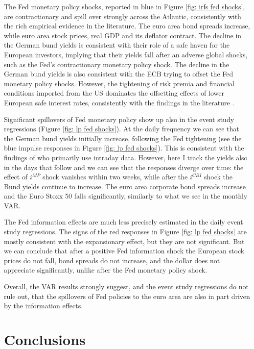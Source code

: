 \documentclass[a4paper,12pt]{article}
\begin{document}
The Fed monetary policy shocks, reported in blue in Figure \ref{fig: irfs fed shocks}, are contractionary and spill over strongly across the Atlantic, consistently with the rich empirical evidence in the literature.
The euro area bond spreads increase, while euro area stock prices, real GDP and its deflator contract. 
The decline in the German bund yields is consistent with their role of a safe haven for the European investors, implying that their yields fall after an adverse global shocks, such as the Fed's contractionary monetary policy shock. The decline in the German bund yields is also consistent with the ECB trying to offset the Fed monetary policy shocks. However, the tightening of risk premia and financial conditions imported from the US
dominates the offsetting effects of lower European safe interest rates, consistently with the findings in the literature \citep{CesaBianchi_Sokol_2022,Degasperi_etal_2021}.

Significant spillovers of Fed monetary policy show up also in the event study regressions (Figure \ref{fig: lp fed shocks}). At the daily frequency we can see that the German bund yields initially increase, following the Fed tightening (see the blue impulse responses in Figure \ref{fig: lp fed shocks}). This is consistent with the findings of \cite{Curcuru_etal_2018} who primarily use intraday data. However, here I track the yields also in the days that follow and we can see that the responses diverge over time: the effect of $i^{MP}$ shock vanishes within two weeks, while after the $i^{CBI}$ shock the Bund yields continue to increase. 
The euro area corporate bond spreads increase and the Euro Stoxx 50 falls significantly, similarly to what we see in the monthly VAR.

The Fed information effects are much less precisely estimated in the daily event study regressions. The signs of the red responses in Figure \ref{fig: lp fed shocks} are  mostly consistent
with the expansionary effect, but they are not significant. But we can conclude
that after a positive Fed information shock the European stock prices do not fall, bond spreads do not increase, and the dollar does not appreciate significantly, unlike after the Fed monetary policy shock.

Overall, the VAR results strongly suggest, and the event study regressions do not rule out, that
the spillovers of Fed policies to the euro area are also in part driven by the information effects.

\section{Conclusions}
\end{document}
